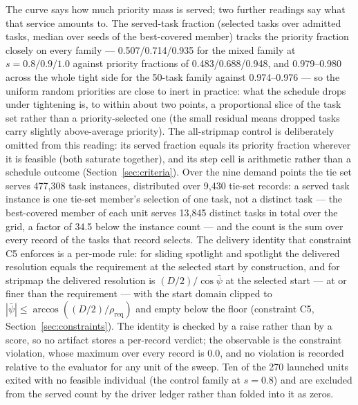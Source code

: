 \documentclass[preprint,authoryear]{elsarticle}
\begin{document}
The curve says how much priority mass is served; two further readings say what that service amounts to. The served-task fraction (selected tasks over admitted tasks, median over seeds of the best-covered member) tracks the priority fraction closely on every family --- 0.507/0.714/0.935 for the mixed family at $s=0.8/0.9/1.0$ against priority fractions of 0.483/0.688/0.948, and 0.979--0.980 across the whole tight side for the 50-task family against 0.974--0.976 --- so the uniform random priorities are close to inert in practice: what the schedule drops under tightening is, to within about two points, a proportional slice of the task set rather than a priority-selected one (the small residual means dropped tasks carry slightly above-average priority). The all-stripmap control is deliberately omitted from this reading: its served fraction equals its priority fraction wherever it is feasible (both saturate together), and its step cell is arithmetic rather than a schedule outcome (Section~\ref{sec:criteria}). Over the nine demand points the tie set serves 477,308 task instances, distributed over 9,430 tie-set records: a served task instance is one tie-set member's selection of one task, not a distinct task --- the best-covered member of each unit serves 13,845 distinct tasks in total over the grid, a factor of 34.5 below the instance count --- and the count is the sum over every record of the tasks that record selects. The delivery identity that constraint C5 enforces is a per-mode rule: for sliding spotlight and spotlight the delivered resolution equals the requirement at the selected start by construction, and for stripmap the delivered resolution is $(D/2)/\cos\bar\psi$ at the selected start --- at or finer than the requirement --- with the start domain clipped to $|\bar\psi|\le\arccos((D/2)/\rho_{\mathrm{req}})$ and empty below the floor (constraint C5, Section~\ref{sec:constraints}). The identity is checked by a raise rather than by a score, so no artifact stores a per-record verdict; the observable is the constraint violation, whose maximum over every record is 0.0, and no violation is recorded relative to the evaluator for any unit of the sweep. Ten of the 270 launched units exited with no feasible individual (the control family at $s=0.8$) and are excluded from the served count by the driver ledger rather than folded into it as zeros.
\end{document}
